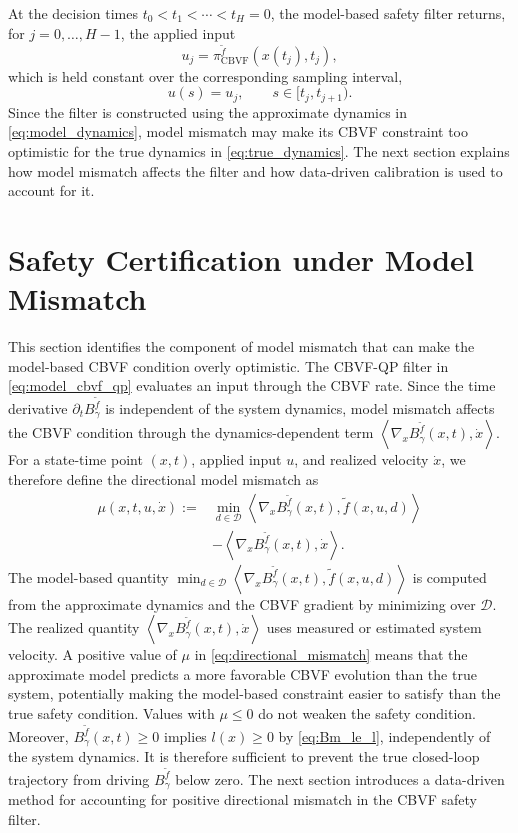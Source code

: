 \documentclass[letterpaper,10pt,conference]{ieeeconf}
\newcommand{\Bm}{B_{\gamma}^{\tilde f}}
\newcommand{\fapp}{\widetilde{f}}
\newcommand{\xv}{x}
\newcommand{\uv}{u}
\newcommand{\dv}{d}
\newcommand{\Dv}{\mathcal{D}}
\newcommand{\ip}[2]{\left\langle #1,#2 \right\rangle}
\begin{document}
At the decision times $t_0<t_1<\cdots<t_H=0$, the model-based safety filter
returns, for $j=0,\ldots,H-1$, the applied input
\begin{equation}
    u_j
    =
    \pi_{\mathrm{CBVF}}^{\tilde f}\!\left(\xv(t_j),t_j\right),
    \label{eq:shield_map}
\end{equation}
which is held constant over the corresponding sampling interval,
\begin{equation}
    \uv(s)=u_j,
    \qquad s\in[t_j,t_{j+1}).
    \label{eq:zoh_control}
\end{equation}
Since the filter is constructed using the approximate dynamics in
\eqref{eq:model_dynamics}, model mismatch may make its CBVF constraint too
optimistic for the true dynamics in \eqref{eq:true_dynamics}. The next section
explains how model mismatch affects the filter and how data-driven calibration
is used to account for it.




\section{Safety Certification under Model Mismatch}
\label{sec:safety_model_mismatch}

This section identifies the component of model mismatch that can make the
model-based CBVF condition overly optimistic. The CBVF-QP filter in \eqref{eq:model_cbvf_qp} evaluates an input through the
CBVF rate. Since the time derivative $\partial_t\Bm$ is independent of the
system dynamics, model mismatch affects the CBVF condition through the
dynamics-dependent term
$\ip{\nabla_{\xv}\Bm(\xv,t)}{\dot\xv}$.
For a state-time point $(\xv,t)$, applied input $\uv$, and realized velocity
$\dot\xv$, we therefore define the directional model mismatch as
\begin{equation}
\begin{aligned}
    \mu(\xv,t,\uv,\dot\xv)
    :=
    &\min_{\dv\in\Dv}
    \ip{\nabla_{\xv}\Bm(\xv,t)}
        {\fapp(\xv,\uv,\dv)} \\
    &-
    \ip{\nabla_{\xv}\Bm(\xv,t)}
        {\dot\xv}.
\end{aligned}
\label{eq:directional_mismatch}
\end{equation}
The model-based quantity
$\min_{\dv\in\Dv}
\ip{\nabla_{\xv}\Bm(\xv,t)}{\fapp(\xv,\uv,\dv)}$
is computed from the approximate dynamics and the CBVF gradient by minimizing
over $\Dv$. The realized quantity
$\ip{\nabla_{\xv}\Bm(\xv,t)}{\dot\xv}$
uses measured or estimated system velocity. 
A positive value of $\mu$ in \eqref{eq:directional_mismatch} means that the approximate model predicts a more
favorable CBVF evolution than the true system, potentially making the
model-based constraint easier to satisfy than the true safety condition.
Values with $\mu\leq0$ do not weaken the safety condition. Moreover,
$\Bm(\xv,t)\ge0$ implies $l(\xv)\ge0$ by \eqref{eq:Bm_le_l}, independently of
the system dynamics. It is therefore sufficient to prevent the true
closed-loop trajectory from driving $\Bm$ below zero. The next section
introduces a data-driven method for accounting for positive directional
mismatch in the CBVF safety filter.
\end{document}

